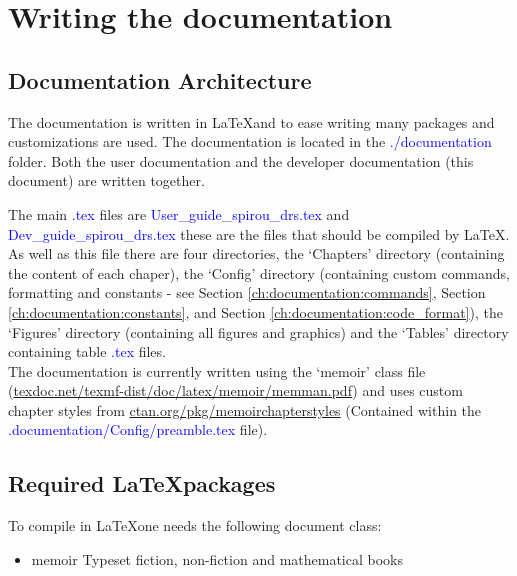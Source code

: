 \chapter{Writing the documentation}
\label{ch:documentation}

\section{Documentation Architecture}
\label{ch:documentation:architecture}

The documentation is written in \LaTeX and to ease writing many packages and customizations are used. The documentation is located in the \textcolor{blue}{./documentation} folder. Both the user documentation and the developer documentation (this document) are written together. 

The main \textcolor{blue}{.tex} files are \textcolor{blue}{User\_guide\_spirou\_drs.tex} and \textcolor{blue}{Dev\_guide\_spirou\_drs.tex} these are the files that should be compiled by \LaTeX. As well as this file there are four directories, the `Chapters' directory (containing the content of each chaper), the `Config' directory (containing custom commands, formatting and constants - see Section \ref{ch:documentation:commands}, Section \ref{ch:documentation:constants}, and Section \ref{ch:documentation:code_format}), the `Figures' directory (containing all figures and graphics) and the `Tables' directory containing table \textcolor{blue}{.tex} files. \\

\noindent The documentation is currently written using the `memoir' class file (\url{texdoc.net/texmf-dist/doc/latex/memoir/memman.pdf}) and uses custom chapter styles from \url{ctan.org/pkg/memoirchapterstyles} (Contained within the \textcolor{blue}{.documentation/Config/preamble.tex} file). 

\section{Required \LaTeX packages}
\label{ch:documentation:packages}

To compile in \LaTeX one needs the following document class:
\begin{itemize}
	\item memoir \dotfill Typeset fiction, non-fiction and mathematical books
\end{itemize}


